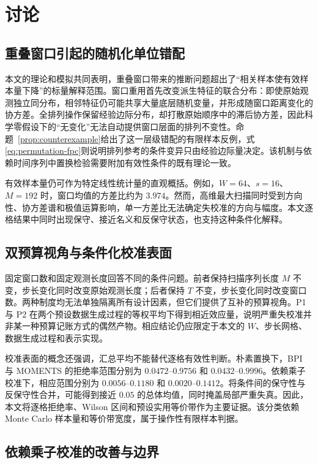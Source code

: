 \section{讨论}\label{sec:discussion}

\subsection{重叠窗口引起的随机化单位错配}\label{sec:disc-validity}

本文的理论和模拟共同表明，重叠窗口带来的推断问题超出了“相关样本使有效样本量下降”的标量解释范围。窗口重用首先改变派生特征的联合分布：即使原始观测独立同分布，相邻特征仍可能共享大量底层随机变量，并形成随窗口距离变化的协方差。全排列操作保留经验边际分布，却打散原始顺序中的滞后协方差，因此科学零假设下的“无变化”无法自动提供窗口层面的排列不变性。命题~\ref{prop:counterexample}给出了这一层级错配的有限样本反例，式\eqref{eq:permutation-fpc}则说明排列参考的条件变异只由经验边际量决定。该机制与依赖时间序列中置换检验需要附加有效性条件的既有理论一致\cite{RomanoTirlea2022}。

有效样本量仍可作为特定线性统计量的直观概括。例如，$W=64$、$s=16$、$M=192$ 时，窗口均值的方差比约为 $3.974$。然而，高维最大扫描同时受到方向性、协方差谱和极值运算影响，单一方差比无法确定失校准的方向与幅度。本文逐格结果中同时出现保守、接近名义和反保守状态，也支持这种条件化解释。

\subsection{双预算视角与条件化校准表面}\label{sec:disc-surface}

固定窗口数和固定观测长度回答不同的条件问题。前者保持扫描序列长度 $M$ 不变，步长变化同时改变原始观测长度；后者保持 $T$ 不变，步长变化同时改变窗口数。两种制度均无法单独隔离所有设计因素，但它们提供了互补的预算视角。P1 与 P2 在两个预设数据生成过程的等权平均下得到相近效应量，说明严重失校准并非某一种预算记账方式的偶然产物。相应结论仍应限定于本文的 $W$、步长网格、数据生成过程和表示实现。

校准表面的概念还强调，汇总平均不能替代逐格有效性判断。朴素置换下，BPI 与 MOMENTS 的拒绝率范围分别为 $0.0472$--$0.9756$ 和 $0.0432$--$0.9996$。依赖乘子校准下，相应范围分别为 $0.0056$--$0.1180$ 和 $0.0020$--$0.1412$。将条件间的保守性与反保守性合并，可能得到接近 $0.05$ 的总体均值，同时掩盖局部严重失真。因此，本文将逐格拒绝率、Wilson 区间和预设实用等价带作为主要证据。该分类依赖 Monte Carlo 样本量和等价带宽度，属于操作性有限样本判据。

\subsection{依赖乘子校准的改善与边界}\label{sec:disc-dmb}


